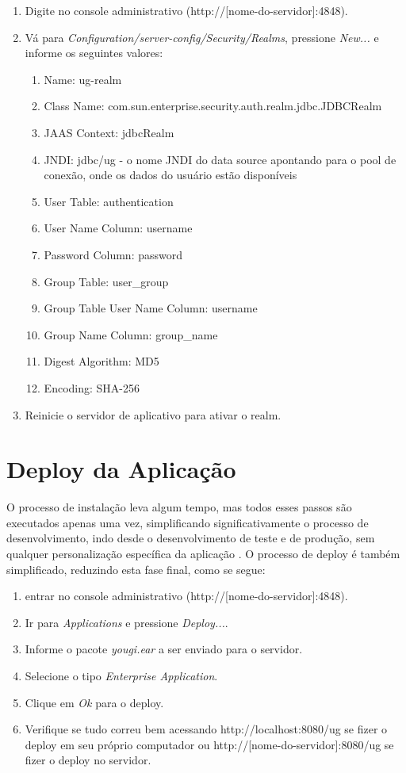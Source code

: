 \documentclass[envcountsame,envcountchap]{svmono}
\begin{document}
\begin{enumerate}
\item Digite no console administrativo (http://[nome-do-servidor]:4848).
\item Vá para \textit{Configuration/server-config/Security/Realms}, pressione \textit{New...} e informe os seguintes valores:
   \begin{enumerate}
   \item Name: ug-realm
   \item Class Name: com.sun.enterprise.security.auth.realm.jdbc.JDBCRealm
   \item JAAS Context: jdbcRealm
   \item JNDI: jdbc/ug - o nome JNDI do data source apontando para o pool de conexão, onde os dados do usuário estão disponíveis
   \item User Table: authentication
   \item User Name Column: username
   \item Password Column: password
   \item Group Table: user\_group
   \item Group Table User Name Column: username
   \item Group Name Column: group\_name
   \item Digest Algorithm: MD5
   \item Encoding: SHA-256
   \end{enumerate}
\item Reinicie o servidor de aplicativo para ativar o realm.
\end{enumerate}

\section{Deploy da Aplicação}

O processo de instalação leva algum tempo, mas todos esses passos são executados apenas uma vez, simplificando significativamente o processo de desenvolvimento, indo desde o desenvolvimento de teste e de produção, sem qualquer personalização específica da aplicação . O processo de deploy é também simplificado, reduzindo esta fase final, como se segue:

\begin{enumerate}
\item entrar no console administrativo (http://[nome-do-servidor]:4848).
\item Ir para \textit{Applications} e pressione \textit{Deploy...}.
\item Informe o pacote \textit{yougi.ear} a ser enviado para o servidor.
\item Selecione o tipo \textit{Enterprise Application}.
\item Clique em \textit{Ok} para o deploy.
\item Verifique se tudo correu bem acessando http://localhost:8080/ug se fizer o deploy em seu próprio computador ou http://[nome-do-servidor]:8080/ug se fizer o deploy no servidor.
\end{enumerate}
\end{document}
